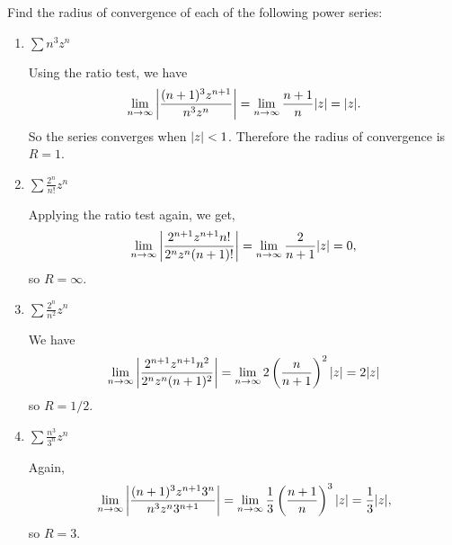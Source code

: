  Find the radius of convergence of each of the following
power series:
\begin{enumerate}
\item $\displaystyle\sum n^3z^n$
  \begin{solution}
    Using the ratio test, we have
    \begin{equation*}
      \lim_{n\to\infty}\left\lvert{\frac{(n+1)^3z^{n+1}}{n^3z^n}}\right\rvert
      = \lim_{n\to\infty}\frac{n+1}n\lvert{z}\rvert = \lvert{z}\rvert.
    \end{equation*}
    So the series converges when $\lvert{z}\rvert < 1$. Therefore the radius
    of convergence is $R = 1$.
  \end{solution}
\item $\displaystyle\sum\frac{2^n}{n!}z^n$
  \begin{solution}
    Applying the ratio test again, we get,
    \begin{equation*}
      \lim_{n\to\infty}\left\lvert{\frac{2^{n+1}z^{n+1}n!}{2^nz^n(n+1)!}}\right\rvert
        = \lim_{n\to\infty}\frac2{n+1}\lvert{z}\rvert = 0,
      \end{equation*}
      so $R = \infty$.
  \end{solution}
\item $\displaystyle\sum\frac{2^n}{n^2}z^n$
  \begin{solution}
    We have
    \begin{equation*}
      \lim_{n\to\infty}\left\lvert{\frac{2^{n+1}z^{n+1}n^2}{2^nz^n(n+1)^2}}\right\rvert
      = \lim_{n\to\infty}2\left(\frac{n}{n+1}\right)^2\lvert{z}\rvert
      = 2\lvert{z}\rvert
    \end{equation*}
    so $R = 1/2$.
  \end{solution}
\item $\displaystyle\sum\frac{n^3}{3^n}z^n$
  \begin{solution}
    Again,
    \begin{equation*}
      \lim_{n\to\infty}\left\lvert{\frac{(n+1)^3z^{n+1}3^n}{n^3z^n3^{n+1}}}\right\rvert
      = \lim_{n\to\infty}\frac13\left(\frac{n+1}n\right)^3\lvert{z}\rvert
      = \frac13\lvert{z}\rvert,
    \end{equation*}
    so $R = 3$.
  \end{solution}
\end{enumerate}


